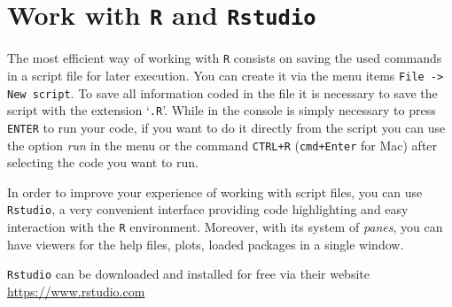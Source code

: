\documentclass[a4paper,12pt]{article}\usepackage[]{graphicx}\usepackage[]{color}
\begin{document}
\section{Work with {\tt R} and \texttt{Rstudio}}

The most efficient way of working with \texttt{R} consists on saving the used commands in a script file for later execution. You can create it via the menu items {\tt File -> New script}. To save all information coded in the file it is necessary to save the script with the extension `{\tt .R}'. While in the console is simply necessary to press {\tt ENTER} to run your code, if you want to do it directly from the script you can use the option \emph{run} in the menu or the command {\tt CTRL+R} ({\tt cmd+Enter} for Mac) after selecting the code you want to run.

\smallskip

 In order to improve your experience of working with script files, you can use  \texttt{Rstudio}, a very convenient interface providing code highlighting and easy interaction with the \texttt{R} environment. Moreover, with its system of \emph{panes}, you can have viewers for the help files, plots, loaded packages in a single window. 

\smallskip

\texttt{Rstudio} can be downloaded and installed for free via their website \url{https://www.rstudio.com}
\end{document}
